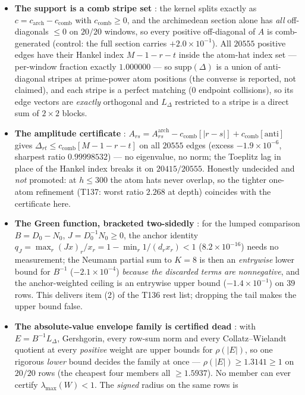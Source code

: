 \documentclass[11pt,a4paper]{article}
\begin{document}
\begin{itemize}[leftmargin=1.5em]
\item \textbf{The support is a comb stripe set} \mE: the kernel splits exactly as
$c=c_{\mathrm{arch}}-c_{\mathrm{comb}}$ with $c_{\mathrm{comb}}\ge0$, and the archimedean section
alone has \emph{all} off-diagonals $\le0$ on $20/20$ windows, so every positive off-diagonal of $A$ is
comb-generated (control: the full section carries $+2.0\times10^{-1}$). All $20555$ positive edges
have their Hankel index $M-1-r-t$ inside the atom-hat index set --- per-window fraction exactly
$1.000000$ --- so $\mathrm{supp}(\Delta)$ is a union of anti-diagonal stripes at prime-power atom
positions (the converse is reported, not claimed), and each stripe is a perfect matching ($0$ endpoint
collisions), so its edge vectors are \emph{exactly} orthogonal and $L_\Delta$ restricted to a stripe
is a direct sum of $2\times2$ blocks.
\item \textbf{The amplitude certificate} \mE:
$A_{rs}=A^{\mathrm{arch}}_{rs}-c_{\mathrm{comb}}[|r-s|]+c_{\mathrm{comb}}[\mathrm{anti}]$ gives
$\Delta_{rt}\le c_{\mathrm{comb}}[M-1-r-t]$ on all $20555$ edges (excess $-1.9\times10^{-6}$,
sharpest ratio $0.99998532$) --- no eigenvalue, no norm; the Toeplitz lag in place of the Hankel index
breaks it on $20415/20555$. Honestly undecided and \emph{not} promoted: at $h\le300$ the atom hats
never overlap, so the tighter one-atom refinement (T137: worst ratio $2.268$ at depth) coincides with
the certificate here.
\item \textbf{The Green function, bracketed two-sidedly} \mE: for the lumped comparison $B=D_0-N_0$,
$J=D_0^{-1}N_0\ge0$, the anchor identity $q_J=\max_r(Jx)_r/x_r=1-\min_r1/(d_rx_r)<1$
($8.2\times10^{-16}$) needs no measurement; the Neumann partial sum to $K=8$ is then an
\emph{entrywise} lower bound for $B^{-1}$ ($-2.1\times10^{-4}$) \emph{because the discarded terms are
nonnegative}, and the anchor-weighted ceiling is an entrywise upper bound ($-1.4\times10^{-1}$) on
$39$ rows. This delivers item (2) of the T136 rest list; dropping the tail makes the upper bound
false.
\item \textbf{The absolute-value envelope family is certified dead} \mX: with $E=B^{-1}L_\Delta$,
Gershgorin, every row-sum norm and every Collatz--Wielandt quotient at every \emph{positive} weight
are upper bounds for $\rho(|E|)$, so one rigorous \emph{lower} bound decides the family at once ---
$\rho(|E|)\ge1.3141\ge1$ on $20/20$ rows (the cheapest four members all $\ge1.5937$). No member can
ever certify $\lambda_{\max}(W)<1$. The \emph{signed} radius on the same rows is

\end{itemize}
\end{document}
